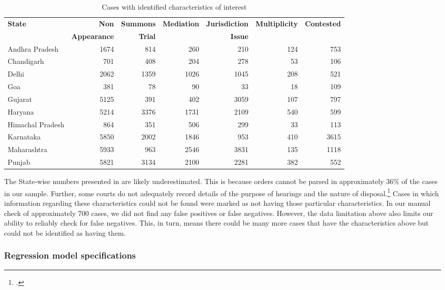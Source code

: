 {\footnotesize
 \begin{longtable}{@{}lrrrrrr@{}}
 \caption{Cases with identified characteristics of interest}
 \label{tab:case_chars}\\
 \toprule
 \textbf{State} & \textbf{Non} & \textbf{Summons} & \textbf{Mediation} & \textbf{Jurisdiction} & \textbf{Multiplicity} & \textbf{Contested} \\
 & \textbf{Appearance} & \textbf{Trial} & & \textbf{Issue} & &\\
 \midrule
 \endhead
 Andhra Pradesh & 1674 & 814 & 260 & 210 & 124 & 753 \\
 Chandigarh & 701 & 408 & 204 & 278 & 53 & 106 \\
 Delhi & 2062 & 1359 & 1026 & 1045 & 208 & 521 \\
 Goa & 381 & 78 & 90 & 33 & 18 & 109 \\
 Gujarat & 5125 & 391 & 402 & 3059 & 107 & 797 \\
 Haryana & 5214 & 3376 & 1731 & 2109 & 540 & 599 \\
 Himachal Pradesh & 864 & 351 & 506 & 299 & 33 & 113 \\
 Karnataka & 5850 & 2002 & 1846 & 953 & 410 & 3615 \\
 Maharashtra & 5933 & 963 & 2546 & 3831 & 135 & 1118 \\
 Punjab & 5821 & 3134 & 2100 & 2281 & 382 & 552 \\
 \bottomrule
\end{longtable}
}

The State-wise numbers presented in  are likely underestimated. This is because orders cannot be parsed in approximately 36\% of the cases in our sample. Further, some courts do not adequately record details of the purpose of hearings and the nature of disposal.\footcite{damle2020_ecourtsData} Cases in which information regarding these characteristics could not be found were marked as not having those particular characteristics. In our manual check of approximately 700 cases, we did not find any false positives or false negatives. However, the data limitation above also limits our ability to reliably check for false negatives. This, in turn, means there could be many more cases that have the characteristics above but could not be identified as having them.

\subsubsection{Regression model specifications} \label{sec:model-selection}


